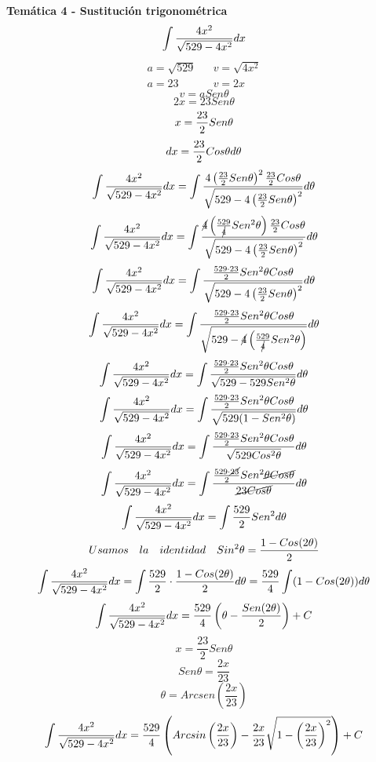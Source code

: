 





\textbf{Temática 4 - Sustitución trigonométrica}
\[\int\frac{4x^2}{\sqrt{529-4x^2}}dx\]
\[
    \begin{aligned}
        a=\sqrt{529} && v=\sqrt{4x^2} \\
        a=23 && v=2x
    \end{aligned}
\]
\[v=aSen\theta\]
\[2x=23Sen\theta\]
\[x=\frac{23}{2}Sen\theta\]
\[dx=\frac{23}{2}Cos\theta d\theta\]
\[\int\frac{4x^2}{\sqrt{529-4x^2}}dx=\int\frac{4\left(\frac{23}{2}Sen\theta\right)^2\frac{23}{2}Cos\theta}{\sqrt{529-4\left(\frac{23}{2}Sen\theta\right)^2}}d\theta\]
\[\int\frac{4x^2}{\sqrt{529-4x^2}}dx=\int\frac{\cancel{4}\left(\frac{529}{\cancel{4}}Sen^2\theta\right)\frac{23}{2}Cos\theta}{\sqrt{529-4\left(\frac{23}{2}Sen\theta\right)^2}}d\theta\]
\[\int\frac{4x^2}{\sqrt{529-4x^2}}dx=\int\frac{\frac{529\cdot23}{2}Sen^2\theta Cos\theta}{\sqrt{529-4\left(\frac{23}{2}Sen\theta\right)^2}}d\theta\]
\[\int\frac{4x^2}{\sqrt{529-4x^2}}dx=\int\frac{\frac{529\cdot23}{2}Sen^2\theta Cos\theta}{\sqrt{529-\cancel{4}\left(\frac{529}{\cancel{4}}Sen^2\theta\right)}}d\theta\]
\[\int\frac{4x^2}{\sqrt{529-4x^2}}dx=\int\frac{\frac{529\cdot23}{2}Sen^2\theta Cos\theta}{\sqrt{529-529Sen^2\theta}}d\theta\]
\[\int\frac{4x^2}{\sqrt{529-4x^2}}dx=\int\frac{\frac{529\cdot23}{2}Sen^2\theta Cos\theta}{\sqrt{529(1-Sen^2\theta)}}d\theta\]
\[\int\frac{4x^2}{\sqrt{529-4x^2}}dx=\int\frac{\frac{529\cdot23}{2}Sen^2\theta Cos\theta}{\sqrt{529Cos^2\theta}}d\theta\]
\[\int\frac{4x^2}{\sqrt{529-4x^2}}dx=\int\frac{\frac{529\cdot\cancel{23}}{2}Sen^2\cancel{\theta Cos\theta}}{\cancel{23Cos\theta}}d\theta\]
\[\int\frac{4x^2}{\sqrt{529-4x^2}}dx=\int\frac{529}{2}Sen^2d\theta\]
\[
    \begin{aligned}
        Usamos && la && identidad && Sin^2\theta=\frac{1-Cos(2\theta)}{2}
    \end{aligned}
\]
\[\int\frac{4x^2}{\sqrt{529-4x^2}}dx=\int\frac{529}{2}\cdot\frac{1-Cos(2\theta)}{2} d\theta=\frac{529}{4}\int(1-Cos(2\theta))d\theta\]
\[\int\frac{4x^2}{\sqrt{529-4x^2}}dx=\frac{529}{4}\left(\theta-\frac{Sen(2\theta)}{2}\right)+C\]
\[x=\frac{23}{2}Sen\theta\]
\[Sen\theta=\frac{2x}{23}\]
\[\theta=Arcsen\left(\frac{2x}{23}\right)\]
\[\int\frac{4x^2}{\sqrt{529-4x^2}}dx=\frac{529}{4}\left(Arcsin\left(\frac{2x}{23}\right)-\frac{2x}{23}\sqrt{1-\left(\frac{2x}{23}\right)^2}\right) + C
\]